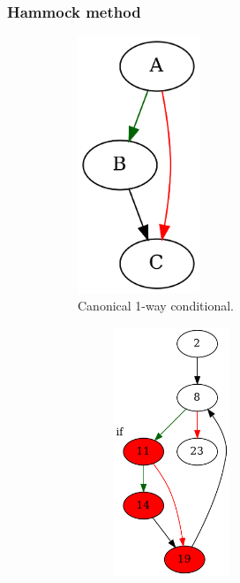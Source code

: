 \documentclass[aspectratio=1610]{beamer}
\begin{document}
\begin{frame}
	\frametitle{Hammock method}


	\begin{figure}[htbp]
		\centering
		\begin{subfigure}[b]{0.20\textwidth}
			\centering
			
			\includegraphics[width=0.4\textwidth]{inc/methods/hammock/if.png}
			\caption{Canonical 1-way conditional.}
		\end{subfigure}
		\quad
		\begin{subfigure}[b]{0.65\textwidth}
			\centering
			\begin{subfigure}[ht]{0.40\textwidth}
				\centering
				\includegraphics[width=0.5\textwidth]{inc/methods/hammock/main_0002a.png}

\end{subfigure}
\end{subfigure}
\end{figure}
\end{frame}
\end{document}
